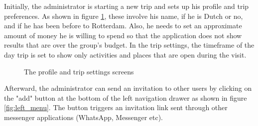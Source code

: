 \documentclass[11pt,a4paper,oneside]{article}
\begin{document}
Initially, the administrator is starting a new trip and sets up his profile and trip preferences. As shown in figure \ref{fig:profile_trip_settings}, these involve his name, if he is Dutch or no, and if he has been before to Rotterdam. Also, he needs to set an approximate amount of money he is willing to spend so that the application does not show results that are over the group’s budget. In the trip settings, the timeframe of the day trip is set to show only activities and places that are open during the visit.

\begin{figure}[H]
    \centering
    \qquad
    \caption{The profile and trip settings screens }%
    \label{fig:profile_trip_settings}%
\end{figure}

Afterward, the administrator can send an invitation to other users by clicking on the "add" button at the bottom of the left navigation drawer as shown in figure \ref{fig:left_menu}. The button triggers an invitation link sent through other messenger applications (WhatsApp, Messenger etc).
\end{document}
